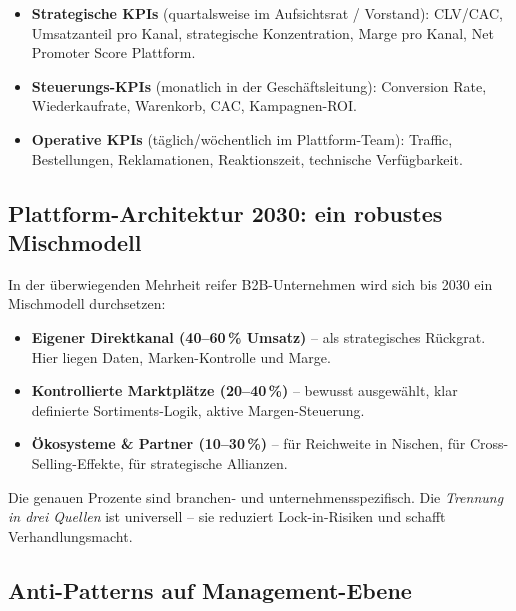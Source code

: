 \documentclass[11pt,a4paper,oneside]{article}
\begin{document}
\begin{itemize}
  \item \textbf{Strategische KPIs} (quartalsweise im Aufsichtsrat / Vorstand): CLV/CAC, Umsatzanteil pro Kanal, strategische Konzentration, Marge pro Kanal, Net Promoter Score Plattform.
  \item \textbf{Steuerungs-KPIs} (monatlich in der Geschäftsleitung): Conversion Rate, Wiederkaufrate, Warenkorb, CAC, Kampagnen-ROI.
  \item \textbf{Operative KPIs} (täglich/wöchentlich im Plattform-Team): Traffic, Bestellungen, Reklamationen, Reaktionszeit, technische Verfügbarkeit.
\end{itemize}

\subsection{Plattform-Architektur 2030: ein robustes Mischmodell}

In der überwiegenden Mehrheit reifer B2B-Unternehmen wird sich bis 2030 ein Mischmodell durchsetzen:

\begin{itemize}
  \item \textbf{Eigener Direktkanal (40--60\,\% Umsatz)} -- als strategisches Rückgrat. Hier liegen Daten, Marken-Kontrolle und Marge.
  \item \textbf{Kontrollierte Marktplätze (20--40\,\%)} -- bewusst ausgewählt, klar definierte Sortiments-Logik, aktive Margen-Steuerung.
  \item \textbf{Ökosysteme \& Partner (10--30\,\%)} -- für Reichweite in Nischen, für Cross-Selling-Effekte, für strategische Allianzen.
\end{itemize}

Die genauen Prozente sind branchen- und unternehmensspezifisch. Die \emph{Trennung in drei Quellen} ist universell -- sie reduziert Lock-in-Risiken und schafft Verhandlungs­macht.

\subsection{Anti-Patterns auf Management-Ebene}
\end{document}
